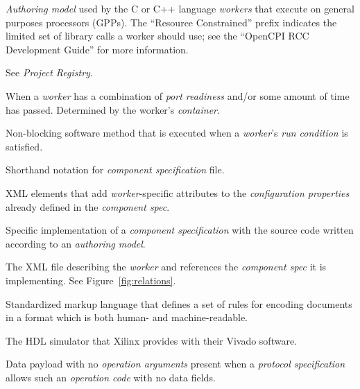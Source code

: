 \begin{description}[style=nextline]
\item[RCC Authoring Model]
\textit{Authoring model} used by the C or C++ language \textit{workers} that execute on general purposes processors (GPPs). The ``Resource Constrained'' prefix indicates the limited set of library calls a worker should use; see the ``OpenCPI RCC Development Guide'' for more information.

\item[Registry]
See \textit{Project Registry}.

\item[Run Condition]
When a \textit{worker} has a combination of \textit{port readiness} and/or some amount of time has passed. Determined by the worker's \textit{container}.

\item[Run Method]
Non-blocking software method that is executed when a \textit{worker}'s \textit{run condition} is satisfied.

\item[Spec file]
Shorthand notation for \textit{component specification} file.

\item[SpecProperty]
XML elements that add \textit{worker}-specific attributes to the \textit{configuration properties} already defined in the \textit{component spec}.

\item[Worker]
Specific implementation of a \textit{component specification} with the source code written according to an \textit{authoring model}.

\item[Worker Description (OWD)]
The XML file describing the \textit{worker} and references the \textit{component spec} it is implementing. See Figure~\ref{fig:relations}.


\item[XML]
Standardized markup language that defines a set of rules for encoding documents in a format which is both human- and machine-readable.

\item[xsim] The HDL simulator that Xilinx provides with their Vivado software.

\item[Zero Length Message]
Data payload with no \textit{operation arguments} present when a \textit{protocol specification} allows such an \textit{operation code} with no data fields.
\end{description}

